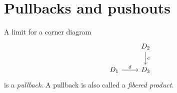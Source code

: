 \documentclass[article, a4paper, 11pt, oneside]{memoir}
\numberwithin{equation}{chapter}
\begin{document}
\chapter{Pullbacks and pushouts}

\begin{definition}[Pullbacks]
    A limit for a corner diagram
    \begin{equation*}
        \begin{tikzcd}
            & D_2
                \ar[d, "e"]
            \\
            D_1
                \ar[r, "d"]
            & D_3
        \end{tikzcd}
    \end{equation*}
    is a \emph{pullback}. A pullback is also called a \emph{fibered product}.
\end{definition}
\end{document}
